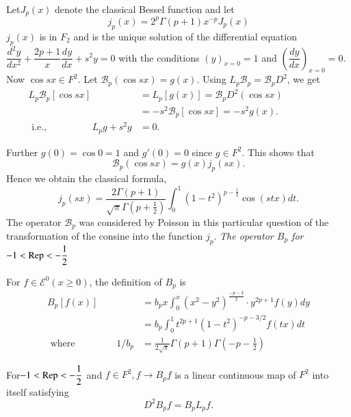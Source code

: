 \begin{remark*}
  Let\pageoriginale $J_p (x) $ denote the classical Bessel function and let 
  $$
  j_p (x) = 2^p \Gamma (p + 1) x^{-p} J_p (x) 
  $$
  $j_p (x) $ is in $F_2$ and is the unique solution of the
  differential equation $\dfrac{d^2 y}{dx^2} + \dfrac{2 p + 1}{x}
  \dfrac{dy}{dx} + s^2 y = 0 $ with the  conditions $(y)_{x=0} = 1$\pageoriginale
  and $\left(\dfrac{dy}{dx}\right)_{ x = 0} = 0$. Now $\cos sx \in F^2$. Let
  $\mathscr{B}_p (\cos sx ) =  g(x)$. Using $L_p \mathscr{B}_p =
  \mathscr{B}_p D^2$, we get  
  \begin{align*}
    L_p \mathscr{B} _p [ \cos sx ] & = L_p [ g(x)] = \mathscr{B}_p D^2
    (\cos sx) \hspace{2cm}\\ 
    & = -s^2 \mathscr{B}_p [ \cos sx ]  = - s^2 g(x).\\
    \text{ i.e.,} \hspace{2cm} L_p g + s^2 g & = 0.  
  \end{align*}
\end{remark*}

Further $g(0) = \cos 0 = 1$ and $g' (0) = 0$ since $g \in F^2 $. This
shows that  
$$
\mathscr{B}_p (\cos sx) = g (x) j_p (sx).  
$$
Hence we obtain the classical formula, 
$$
j_p (sx) = \frac{ 2 \Gamma (p  + 1)}{\sqrt{ \pi }\Gamma (p +
  \frac{1}{2})} \int_0^1 (1 -t^2)^{ p - \frac{1}{2}}\cos (stx) dt.  
$$
The operator $\mathscr{B}_p$ was considered by Poisson in this
particular question of the transformation of the consine into the
function $j_p$. \textit{The operator $B_p$ for $-1< \operatorname{Rep}< -
  \dfrac{1}{2}$} 

For $f \in \mathscr{E}^ 0 (x \geq 0)$, the definition of $B_p$ is 
\begin{align*}
  B_p [ f(x) ] & = b_p x \int^x _0 (x^2 - y^2 )^{\frac{-p-3}{2}}\cdot y^{2p + 1} f(y)
  dy\\
  &  = b_p \int_0^1 t^{ 2p+1} (1 - t^2)^{-p-3/2} f (tx) dt \\ 
  \text{ where } \qquad \qquad   1 / b_p & = \frac{1}{2\sqrt{\pi}}
  \Gamma (p + 1) \Gamma \left(- p - \frac{1}{2}\right) 
 \end{align*} 
 
\begin{proposition}\label{part1:chap3:sec1:prop2} %
  For\pageoriginale $- 1 < \operatorname{Rep}< - \dfrac{1}{2}$ and $f \in F^2, f \to B_p f$ is a
  linear continuous map of $F^2$ into itself satisfying  
  $$
  D^2 B_p f = B_p L_p f. 
  $$
\end{proposition}
 
